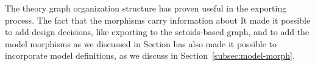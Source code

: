 The theory graph organization structure has proven useful in the exporting process. The fact that the morphisms carry information about It made it possible to add design decisions, like exporting to the setoids-based graph, and to add the model morphisms as we discussed in Section has also made it possible to incorporate model definitions, as we discuss in Section~\ref{subsec:model-morph}. 

\begin{comment}
Our algorithms generate record definitions, inductive data types and functions. We study how those three constructs look like in Agda. 

\section{Record Definitions}
A record in Tog is has the type \lstmath{Decl} and is created using the \lstmath{Record} constructor as follows 
\begin{hscode}
Record Name Params RecordBody
\end{hscode}
The parameters are either empty or contains \lstmath{[Binding]}, as discussed in \ref{ch:tog}. \lstmath{RecordBody} contains information about the kind of the record, its constructor, and the fields it contains. A simplified view of the fields is \lstmath{[Constr]}. 

A record in Agda consists of 
\begin{itemize}
\item the keyword \lstmath{record}
\item the name of the type 
\item list of parameters surrounded by parenthesis  
\item A semicolon that seperates the name and params from the type 
\item the keyword \lstmath{where}
\item 
\end{itemize}
\end{comment}


